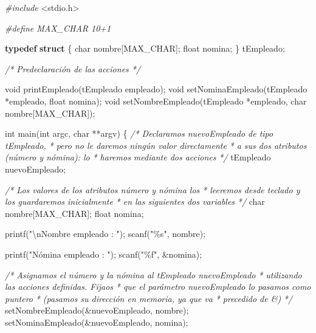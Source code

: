 \documentclass[
]{book}
\newenvironment{Shaded}{\begin{snugshade}}{\end{snugshade}}
\newcommand{\CommentTok}[1]{\textcolor[rgb]{0.56,0.35,0.01}{\textit{#1}}}
\newcommand{\DataTypeTok}[1]{\textcolor[rgb]{0.13,0.29,0.53}{#1}}
\newcommand{\ImportTok}[1]{#1}
\newcommand{\KeywordTok}[1]{\textcolor[rgb]{0.13,0.29,0.53}{\textbf{#1}}}
\newcommand{\NormalTok}[1]{#1}
\newcommand{\PreprocessorTok}[1]{\textcolor[rgb]{0.56,0.35,0.01}{\textit{#1}}}
\newcommand{\SpecialCharTok}[1]{\textcolor[rgb]{0.00,0.00,0.00}{#1}}
\newcommand{\StringTok}[1]{\textcolor[rgb]{0.31,0.60,0.02}{#1}}
\begin{document}
\begin{Shaded}
\begin{Highlighting}[]
\PreprocessorTok{\#include }\ImportTok{\textless{}stdio.h\textgreater{}}

\PreprocessorTok{\#define MAX\_CHAR 10+1}

\KeywordTok{typedef} \KeywordTok{struct}\NormalTok{ \{}
    \DataTypeTok{char}\NormalTok{ nombre[MAX\_CHAR];}
    \DataTypeTok{float}\NormalTok{ nomina;}
\NormalTok{\} tEmpleado;}

\CommentTok{/* Predeclaración de las acciones */}

\DataTypeTok{void}\NormalTok{ printEmpleado(tEmpleado empleado);}
\DataTypeTok{void}\NormalTok{ setNominaEmpleado(tEmpleado *empleado, }\DataTypeTok{float}\NormalTok{ nomina);}
\DataTypeTok{void}\NormalTok{ setNombreEmpleado(tEmpleado *empleado, }\DataTypeTok{char}\NormalTok{ nombre[MAX\_CHAR]);}

\DataTypeTok{int}\NormalTok{ main(}\DataTypeTok{int}\NormalTok{ argc, }\DataTypeTok{char}\NormalTok{ **argv) \{}
    \CommentTok{/* Declaramos nuevoEmpleado de tipo tEmpleado,}
\CommentTok{     * pero no le daremos ningún valor directamente}
\CommentTok{     * a sus dos atributos (número y nómina): lo}
\CommentTok{     * haremos mediante dos acciones}
\CommentTok{     */}
\NormalTok{    tEmpleado nuevoEmpleado;}
   
    \CommentTok{/* Los valores de los atributos número y nómina los}
\CommentTok{     * leeremos desde teclado y los guardaremos inicialmente}
\CommentTok{     * en las siguientes dos variables}
\CommentTok{     */}
    \DataTypeTok{char}\NormalTok{ nombre[MAX\_CHAR];}
    \DataTypeTok{float}\NormalTok{ nomina;}
   
\NormalTok{    printf(}\StringTok{"}\SpecialCharTok{\textbackslash{}n}\StringTok{Nombre empleado : "}\NormalTok{);}
\NormalTok{    scanf(}\StringTok{"\%s"}\NormalTok{, nombre);}
      
\NormalTok{    printf(}\StringTok{"Nómina empleado : "}\NormalTok{);}
\NormalTok{    scanf(}\StringTok{"\%f"}\NormalTok{, \&nomina);}
   
    \CommentTok{/* Asignamos el número y la nómina al tEmpleado nuevoEmpleado}
\CommentTok{     * utilizando las acciones definidas. Fijaos}
\CommentTok{     * que el parámetro nuevoEmpleado lo pasamos como puntero}
\CommentTok{     * (pasamos su dirección en memoria, ya que va}
\CommentTok{     * precedido de \&)}
\CommentTok{     */}
\NormalTok{    setNombreEmpleado(\&nuevoEmpleado, nombre);}
\NormalTok{    setNominaEmpleado(\&nuevoEmpleado, nomina);}
   

\end{Highlighting}
\end{Shaded}
\end{document}
